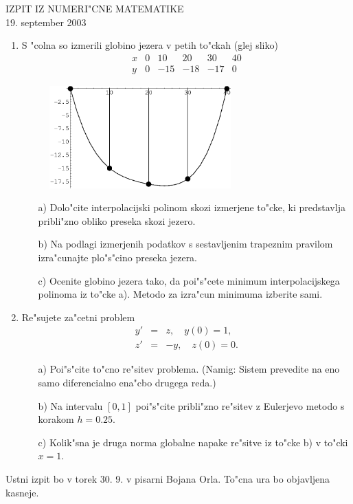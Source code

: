 

\begin{center}
  IZPIT IZ NUMERI"CNE MATEMATIKE\\
  19. september 2003
\end{center}
\vspace{2cm}

\begin{enumerate}
  \item S "colna so izmerili globino jezera v petih to"ckah (glej sliko)
  $$\begin{array}{l|rrrrr}
      x & 0 & 10 & 20 & 30 &40\\ \hline
      y & 0 & -15 & -18 & -17 & 0
     \end{array}
  $$
  \begin{figure}[h]
  \begin{center}
       \includegraphics[width=7cm]{jezero.eps} 
  \end{center}
  \end{figure}
  \begin{itemize}
    \item[a)] Dolo"cite interpolacijski polinom skozi izmerjene to"cke,
    ki predstavlja pribli"zno obliko preseka skozi jezero. 

    \item[b)] Na podlagi izmerjenih podatkov s sestavljenim trapeznim
    pravilom izra"cunajte plo"s"cino preseka jezera.
 
     \item[c)] Ocenite globino jezera tako, da poi"s"cete minimum
     interpolacijskega polinoma iz to"cke a). Metodo za izra"cun
     minimuma izberite sami. 

  \end{itemize}
  
  \item Re"sujete za"cetni problem 
  \begin{eqnarray*}
    y' &=& z,\quad y(0)=1,\\
    z' &=& -y, \quad z(0)=0.
  \end{eqnarray*}
 
   \begin{itemize}
    \item[a)] Poi"s"cite to"cno re"sitev problema. (Namig: Sistem
    prevedite na eno samo diferencialno ena"cbo drugega reda.) 

    \item[b)] Na intervalu $[0,1]$ poi"s"cite pribli"zno re"sitev z 
    Eulerjevo metodo
    s korakom $h=0.25$.

    \item[c)] Kolik"sna je druga norma globalne napake re"sitve iz to"cke b)
    v to"cki $x=1$. 

  \end{itemize}
\end{enumerate}
Ustni izpit bo v torek 30. 9. v pisarni Bojana Orla. To"cna ura bo objavljena 
kasneje.
